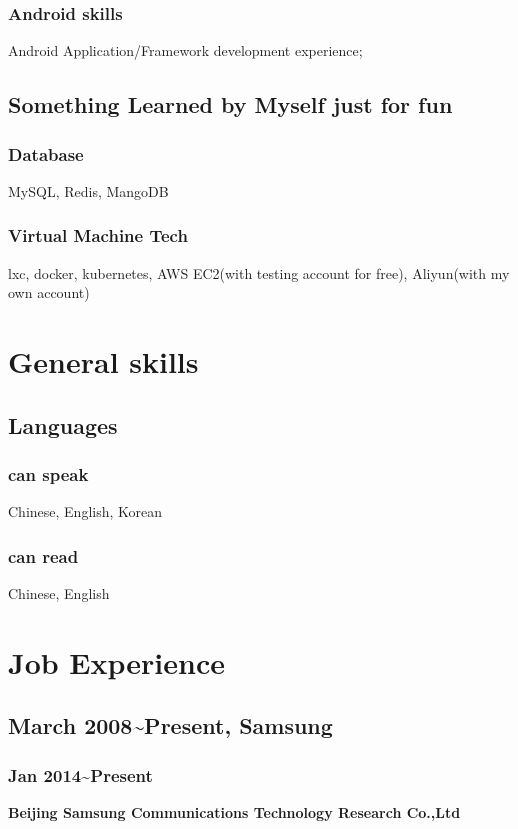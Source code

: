 \documentclass{article}
\begin{document}
\subsubsection{Android skills}
Android Application/Framework development experience;

\subsection{Something Learned by Myself just for fun}
\subsubsection {Database}
MySQL, Redis, MangoDB

\subsubsection {Virtual Machine Tech}
lxc, docker, kubernetes, AWS EC2(with testing account for free), Aliyun(with my own account)

\section{General skills}
\subsection{Languages}

\subsubsection{can speak}
Chinese, English, Korean

\subsubsection{can read}
Chinese, English

\section{Job Experience}
\subsection{March 2008\~{}Present, Samsung}

\subsubsection{Jan 2014\~{}Present}
\textbf{Beijing Samsung Communications Technology Research Co.,Ltd}
\end{document}
